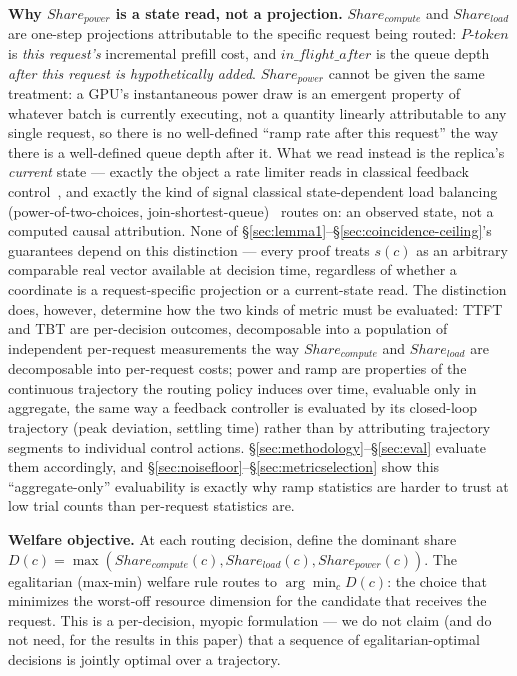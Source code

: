 \documentclass[sigconf,review,anonymous]{acmart}
\begin{document}
\textbf{Why $\mathit{Share_{power}}$ is a state read, not a projection.}
$\mathit{Share_{compute}}$ and $\mathit{Share_{load}}$ are one-step projections attributable
to the specific request being routed: $P\text{-}token$ is \emph{this request's} incremental
prefill cost, and $\mathit{in\_flight\_after}$ is the queue depth \emph{after this request is
hypothetically added}. $\mathit{Share_{power}}$ cannot be given the same treatment: a GPU's
instantaneous power draw is an emergent property of whatever batch is currently executing,
not a quantity linearly attributable to any single request, so there is no well-defined
``ramp rate after this request'' the way there is a well-defined queue depth after it. What we
read instead is the replica's \emph{current} state --- exactly the object a rate limiter reads
in classical feedback control~\cite{astrom2008feedback}, and exactly the kind of signal
classical state-dependent load balancing (power-of-two-choices,
join-shortest-queue)~\cite{mitzenmacher2001power, azar1994balanced} routes on: an observed
state, not a computed causal attribution. None of \S\ref{sec:lemma1}--\S\ref{sec:coincidence-ceiling}'s
guarantees depend on this distinction --- every proof treats $s(c)$ as an arbitrary comparable
real vector available at decision time, regardless of whether a coordinate is a
request-specific projection or a current-state read. The distinction does, however, determine
how the two kinds of metric must be evaluated: TTFT and TBT are per-decision outcomes,
decomposable into a population of independent per-request measurements the way
$\mathit{Share_{compute}}$ and $\mathit{Share_{load}}$ are decomposable into per-request costs;
power and ramp are properties of the continuous trajectory the routing policy induces over
time, evaluable only in aggregate, the same way a feedback controller is evaluated by its
closed-loop trajectory (peak deviation, settling time) rather than by attributing trajectory
segments to individual control actions. \S\ref{sec:methodology}--\S\ref{sec:eval} evaluate them
accordingly, and \S\ref{sec:noisefloor}--\S\ref{sec:metricselection} show this ``aggregate-only''
evaluability is exactly why ramp statistics are harder to trust at low trial counts than
per-request statistics are.

\textbf{Welfare objective.} At each routing decision, define the dominant share
$D(c) = \max(\mathit{Share_{compute}}(c), \mathit{Share_{load}}(c), \mathit{Share_{power}}(c))$.
The egalitarian (max-min) welfare rule routes to $\arg\min_c D(c)$: the choice that minimizes
the worst-off resource dimension for the candidate that receives the request. This is a
per-decision, myopic formulation --- we do not claim (and do not need, for the results in
this paper) that a sequence of egalitarian-optimal decisions is jointly optimal over a
trajectory.
\end{document}
